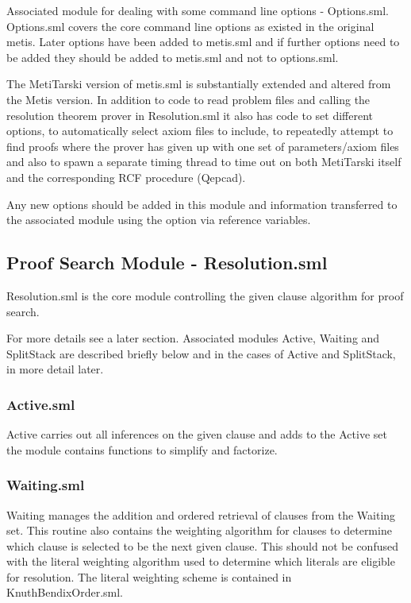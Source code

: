 \documentclass[11pt, oneside]{article}   	%
\begin{document}
Associated module for dealing with some command line options  - Options.sml. Options.sml covers the core command line options as existed in the original metis. Later options
have been added to metis.sml and if further options need to be added they should be added to metis.sml and not to options.sml.

The MetiTarski version of metis.sml is substantially extended and altered from the Metis version. In addition to code to read problem files and calling the resolution theorem prover in Resolution.sml it also has code to set different options, to automatically select axiom files to include, to repeatedly attempt to find proofs where the prover has given up with one set of parameters/axiom files and also to spawn a separate timing thread to time out on both MetiTarski itself and the corresponding RCF procedure (Qepcad).

Any new options should be added in this module and information transferred to the associated module using the option via reference variables.

\subsection{Proof Search Module - Resolution.sml}

Resolution.sml is the core module controlling the given clause algorithm for proof search.

For more details see a later section. Associated modules Active, Waiting and SplitStack are described briefly below and in the cases of Active and SplitStack, in more detail later.

\subsubsection{Active.sml}
Active carries out all inferences on the given clause and adds to the Active set
the module contains functions to simplify and factorize.

\subsubsection{Waiting.sml}
Waiting manages the addition and ordered retrieval of clauses from the Waiting set.
This routine also contains the weighting algorithm for clauses to determine which clause is selected
to be the next given clause. This should not be confused with the literal weighting algorithm used to determine which literals are eligible for resolution. The literal weighting scheme is contained in KnuthBendixOrder.sml.
\end{document}
